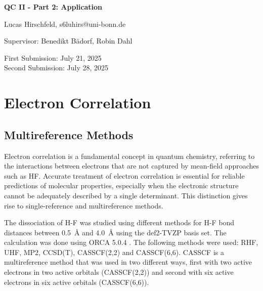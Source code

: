 \documentclass[fontsize=11pt,a4paper,oneside]{scrartcl}
\makeatletter
\def\Autor{Lucas Hirschfeld, s6luhirs@uni-bonn.de}
\def\Titel{QC II - Part 2: Application}
\def\Date{First Submission: July 21, 2025 \\ Second Submission: July 28, 2025}
\def\PiC{Supervisor: Benedikt Bädorf, Robin Dahl}
\def\Abstract{}
\makeatother
\begin{document}
\pagestyle{empty}
\begin{titlepage}
    \begin{center}
        \vspace*{\fill}
        {\LARGE\bfseries \Titel}\par\vspace{2cm}
        {\Autor\par\vspace{0.5cm}\PiC\par\vspace{1cm}\par\vspace{0.2cm}\Date\par\vspace{5cm}}
    \end{center}
    {\Abstract\vspace{0.5cm}\par}\vfill
\end{titlepage}

\pagestyle{scrheadings}
\tableofcontents
{}
\clearpage


\section{Electron Correlation}

\subsection{Multireference Methods}

Electron correlation is a fundamental concept in quantum chemistry, referring to the interactions between electrons that are not captured by mean-field approaches such as \ac{HF}. Accurate treatment of electron correlation is essential for reliable predictions of molecular properties, especially when the electronic structure cannot be adequately described by a single determinant. This distinction gives rise to single-reference and multireference methods.

The dissociation of H-F was studied using different methods for H-F bond distances between 0.5~\AA{} and 4.0~\AA{} using the def2-TVZP\autocite{Hellweg2014} basis set. The calculation was done using ORCA 5.0.4 \autocite{Neese2012,Neese2022}. The following methods were used: \ac{RHF}, \ac{UHF}, \ac{MP2}\autocite{Moller1934}, \ac{CCSD(T)}, \acs{CASSCF}(2,2) and \acs{CASSCF}(6,6). \Acf{CASSCF}\autocite{Roos1980} is a multireference method that was used in two different ways, first with two active electrons in two active orbitals (CASSCF(2,2)) and second with six active electrons in six active orbitals (CASSCF(6,6)).
\end{document}
